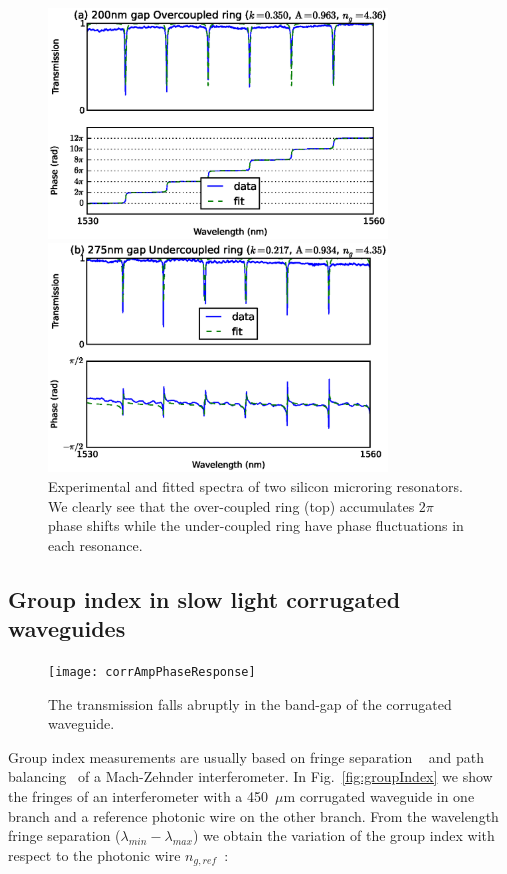 \documentclass[journal]{IEEEtran}
\begin{document}
\begin{figure}[htb]
  \centerline{\includegraphics[width=9cm]{r20g200TE_fitPhaseAmp}}
  \centerline{\includegraphics[width=9cm]{r20g275TE_fitPhaseAmp}}
  \caption{Experimental and fitted spectra of two silicon microring resonators. We clearly see that the over-coupled ring (top) accumulates $2\pi$ phase shifts while the under-coupled ring have phase fluctuations in each resonance. }
  \label{fig:overcoupled} %
\end{figure}

\subsection{Group index in slow light corrugated waveguides}
\label{sec:corrWaveguides}

\begin{figure}[htb]
  \centerline{\texttt{[image: corrAmpPhaseResponse]}}
  \caption{The transmission falls abruptly in the band-gap of the corrugated waveguide.}
  \label{fig:corr}
\end{figure}

Group index measurements are usually based on fringe separation ~\cite{shang81,vlasov:05,yao:811,Dulkeith2006} and path balancing~\cite{Cohen:82,Knox:88,Liang:98} of a Mach-Zehnder interferometer.
In Fig.~\ref{fig:groupIndex} we show the fringes of an interferometer with a 450~$\mu$m corrugated waveguide in one branch and a reference photonic wire on the other branch.
From the wavelength fringe separation ($ \lambda_{min} - \lambda_{max} $) we obtain the variation of the group index with respect to the photonic wire $ n_{g,ref} $~\cite{vlasov:05}:
\end{document}
